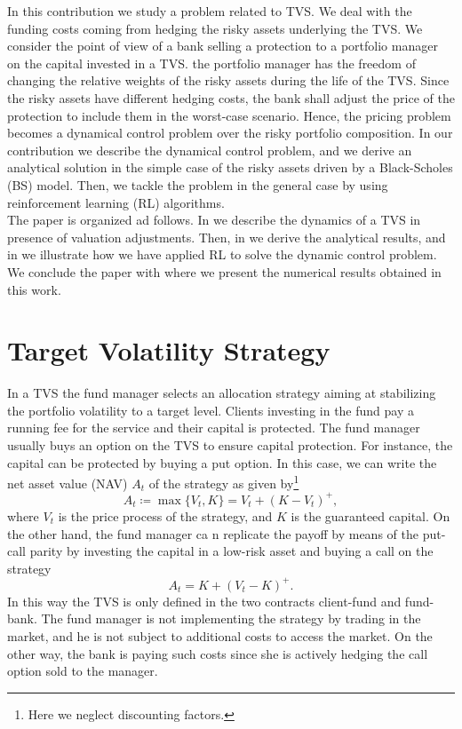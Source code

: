 \documentclass[11pt]{article}
\begin{document}
In this contribution we study a problem related to TVS. We deal with the funding costs coming from hedging the risky assets underlying the TVS. We consider the point of view of a bank selling a protection to a portfolio manager on the capital invested in a TVS. the portfolio manager has the freedom of changing the relative weights of the risky assets during the life of the TVS. Since the risky assets have different hedging costs, the bank shall adjust the price of the protection to include them in the worst-case scenario. Hence, the pricing problem becomes a dynamical control problem over the risky portfolio composition. In our contribution we describe the dynamical control problem, and we derive an analytical solution in the simple case of the risky assets driven by a Black-Scholes (BS) model. Then, we tackle the problem in the general case by using reinforcement learning (RL) algorithms.
\\

The paper is organized ad follows. In  we describe the dynamics of a TVS in presence of valuation adjustments. Then, in  we derive the analytical results, and in  we illustrate how we have applied RL to solve the dynamic control problem. We conclude the paper with  where we present the numerical results obtained in this work.


\section{Target Volatility Strategy}\label{sec:TVS}
In a TVS the fund manager selects an allocation strategy aiming at stabilizing the portfolio volatility to a target level. Clients investing in the fund pay a running fee for the service and their capital is protected. The fund manager usually buys an option on the TVS to ensure capital protection. For instance, the capital can be protected by buying a put option. In this case, we can write the net asset value (NAV) $A_t$ of the strategy as given by\footnote{Here we neglect discounting factors.}
\begin{equation}
    A_t \coloneqq \max\{V_t,K\} = V_t + (K-V_t)^+,
\end{equation}
where $V_t$ is the price process of the strategy, and $K$ is the guaranteed capital. On the other hand, the fund manager ca n replicate the payoff by means of the put-call parity by investing the capital in a low-risk asset and buying a call on the strategy
\begin{equation}
    A_t = K + (V_t-K)^+.
\end{equation}
In this way the TVS is only defined in the two contracts client-fund and fund-bank. The fund manager is not implementing the strategy by trading in the market, and he is not subject to additional costs to access the market. On the other way, the bank is paying such costs since she is actively hedging the call option sold to the manager. 
\end{document}
